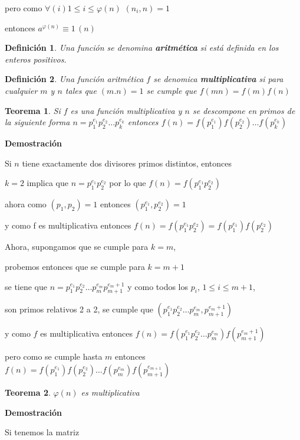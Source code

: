 \documentclass[a4paper,12pt]{report}
\newtheorem*{teo}{Teorema}
\newtheorem*{dfn}{Definición}
\begin{document}
pero como $\forall(i) 1\leq i\leq \varphi(n)$ $(n_i,n)=1$

entonces $a^{\varphi(n)}\equiv 1\, (n)$


\begin{dfn}
 Una función se denomina \textbf{aritmética} si está definida en los enteros positivos.
\end{dfn}

\begin{dfn}
 Una función aritmética  $f$ se denomica \textbf{multiplicativa} si para cualquier $m$ y $n$ tales que $(m.n)=1$ se cumple que $f(mn)=f(m)f(n)$
\end{dfn}

\begin{teo}
 Si $f$ es una función multiplicativa y $n$ se descompone en primos de la siguiente forma $n=p_1^{e_1}p_2^{e_2}\dots p_k^{e_k}$ entonces $f(n)=f(p_1^{e_1})f(p_2^{e_2})\dots f(p_k^{e_k})$ 
\end{teo}


\textbf{Demostración}

Si $n$ tiene exactamente dos divisores primos distintos, entonces 

$k=2$ implica que $n=p_1^{e_1}p_2^{e_2}$ por lo que $f(n)=f(p_1^{e_1}p_2^{e_2})$

ahora como $(p_1,p_2)=1$ entonces $(p_1^{e_1},p_2^{e_2})=1$ 

y como f es multiplicativa entonces $f(n)=f(p_1^{e_1}p_2^{e_2})=f(p_1^{e_1})f(p_2^{e_2})$


Ahora, supongamos que se cumple para $k=m$, 

probemos entonces que se cumple para $k=m+1$

se tiene que $n=p_1^{e_1}p_2^{e_2}\dots p_{m}^{e_m}p_{m+1}^{e_m+1}$ y como todos los $p_i$, $1\leq i \leq m+1$, 

son primos relativos 2 a 2, se cumple que $(p_1^{e_1}p_2^{e_2}\dots p_{m}^{e_m},p_{m+1}^{e_m+1})$

y como $f$ es multiplicativa entonces $f(n)=f(p_1^{e_1}p_2^{e_2}\dots p_{m}^{e_m})f(p_{m+1}^{e_m+1})$

pero como se cumple hasta $m$ entonces $f(n)=f(p_1^{e_1})f(p_2^{e_2})\dots f(p_m^{e_m})f(p_{m+1}^{e_{m+1}})$


\begin{teo}
 $\varphi(n)$ es multiplicativa
\end{teo}
\newpage

\textbf{Demostración}

Si tenemos la matriz
\end{document}
